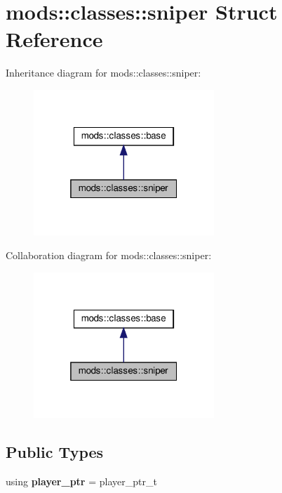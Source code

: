 \hypertarget{structmods_1_1classes_1_1sniper}{}\section{mods\+:\+:classes\+:\+:sniper Struct Reference}
\label{structmods_1_1classes_1_1sniper}


Inheritance diagram for mods\+:\+:classes\+:\+:sniper\+:\nopagebreak
\begin{figure}[H]
\begin{center}
\leavevmode
\includegraphics[width=193pt]{structmods_1_1classes_1_1sniper__inherit__graph}
\end{center}
\end{figure}


Collaboration diagram for mods\+:\+:classes\+:\+:sniper\+:\nopagebreak
\begin{figure}[H]
\begin{center}
\leavevmode
\includegraphics[width=193pt]{structmods_1_1classes_1_1sniper__coll__graph}
\end{center}
\end{figure}
\subsection*{Public Types}
\begin{DoxyCompactItemize}
\item 
\mbox{\label{structmods_1_1classes_1_1sniper_ae150a35613d3e9c4b6aadd7d09beb885}} 
using {\bfseries player\+\_\+ptr} = player\+\_\+ptr\+\_\+t
\end{DoxyCompactItemize}
